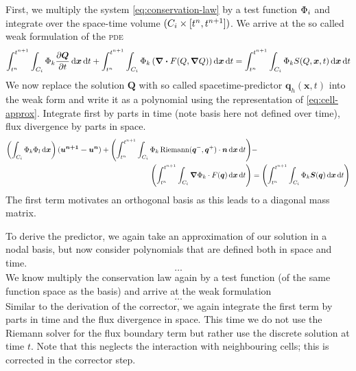 First, we multiply the system \cref{eq:conservation-law} by a test function $\Phi_{i}$ and integrate over the space-time volume $(C_{i} \times [t^n, t^{n+1}])$.
We arrive at the so called weak formulation of the \textsc{pde} 
\begin{equation}
  \label{eq:weak-pde}
\intdt{\intdcell{
\testfunction{k} \pdv{\bm{Q}}{t}
}}
+
\intdt{\intdcell{
    \testfunction{k} \left( \div{F(Q, \gradient{Q})} \right)
}}
=
\intdt{\intdcell{
    \testfunction{k} S(Q, \bm{x}, t)
}}
\end{equation}
\newcommand{\stpredictor}[1]{\bm{q}_{#1}}
We now replace the solution $\bm{Q}$ with so called spacetime-predictor $\stpredictor{h}(\bm{x},t)$ into the weak form and write it as a polynomial using the representation of \cref{eq:cell-approx}.
Integrate first by parts in time (note basis here not defined over time), flux divergence by parts in space.
\begin{align}
\begin{split}
\label{eq:corrector}
\left(
\intdcell{
  \testfunction{k} \sbasis{l}
}
\right)
(\bm{u^{n+1} - u^{n}})
+
\left(\intdt{\intdcell{
      \testfunction{k} \Riemann(\bm{q}^-, \bm{q}^+) \cdot \normal
}}\right)
&-\\
\left(\intdt{\intdcell{
    \gradient{\testfunction{k}} \cdot  F(\bm{q})
}}\right)
&=
\left(\intdt{\intdcell{
      \testfunction{k} \source(\bm{q})
}}\right)
\end{split}
\end{align}
The first term motivates an orthogonal basis as this leads to a diagonal mass matrix.

To derive the predictor, we again take an approximation of our solution in a nodal basis, but now consider polynomials that are defined both in space and time.
\begin{equation}
  \ldots
\end{equation}
We know multiply the conservation law again by a test function (of the same function space as the basis) and arrive at the weak formulation
\begin{equation}
  \label{eq:weak-pde-space-time}
 \ldots
\end{equation}
Similar to the derivation of the corrector, we again integrate the first term by parts in time and the flux divergence in space.
This time we do not use the Riemann solver for the flux boundary term but rather use the discrete solution at time $t$.
Note that this neglects the interaction with neighbouring cells; this is corrected in the corrector step.

